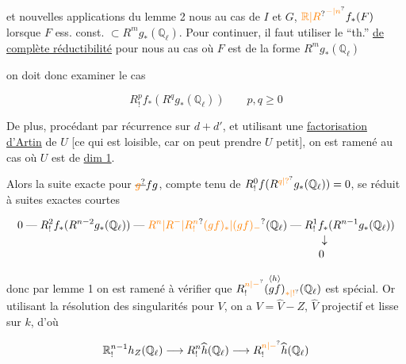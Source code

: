 et   nouvelles applications du lemme 2 nous  au cas de $I$ et $G$, $\unsure{\mathbb R|R}^{\unsure{-|n}}f_*(F)$ lorsque  $F$ ess. const. $\subset R^{m}g_*(\mathbb Q_\ell)$. Pour continuer, il faut utiliser le ``th.'' \uline{de complète réductibilité} pour nous  au cas où $F$ est de la forme $R^m g_*(\mathbb Q_\ell)$

on doit donc examiner le cas

\[ R^p_! f_*(R^q g_*(\mathbb Q_\ell))\qquad p,q\geq0 \]



De plus, procédant par récurrence sur $d+d'$, et utilisant une \uline{factorisation d'Artin} de $U$ [ce qui est loisible, car on peut prendre $U$ petit], on est ramené au cas où $U$ est de \uline{dim 1}.

Alors la suite exacte pour $\deleted{\unsure{g}}fg$,  compte tenu de $R^0_!f(R^{\unsure{q|?}} g_*(\mathbb Q_\ell))=0$, se réduit à  suites exactes courtes

\[
\begin{aligned}
0\mathrel{\text{---}}R^2_!f_*(R^{n-2}g_*(\mathbb Q_\ell))&\mathrel{\text{---}}\unsure{R^n|R^-|R^n_!}\unsure{(gf)_*|(gf)_{-}}(\mathbb Q_\ell)\mathrel{\text{---}}R^1_! f_*(R^{n-1}g_*(\mathbb Q_\ell))\\[-2pt]
&\hspace{17em}\downarrow\\[-2pt]&\hspace{17em}0
\end{aligned}
\]

donc par lemme 1 on est ramené à vérifier que $R^{\unsure{n|-}}_!\overset{\inserted{h}}{(gf)}_{\unsure{*|!}}(\mathbb Q_\ell)$ est spécial. Or utilisant la résolution des singularités pour $V$, on a $V=\widehat V-Z$, $\widehat V$ projectif et lisse sur $k$, d'où

\[ \mathbb R^{n-1}_! h_Z(\mathbb Q_\ell)\longrightarrow R^n_!\widehat h(\mathbb Q_\ell)\longrightarrow R^{\unsure{n|-}}_!\widehat h(\mathbb Q_\ell) \]


